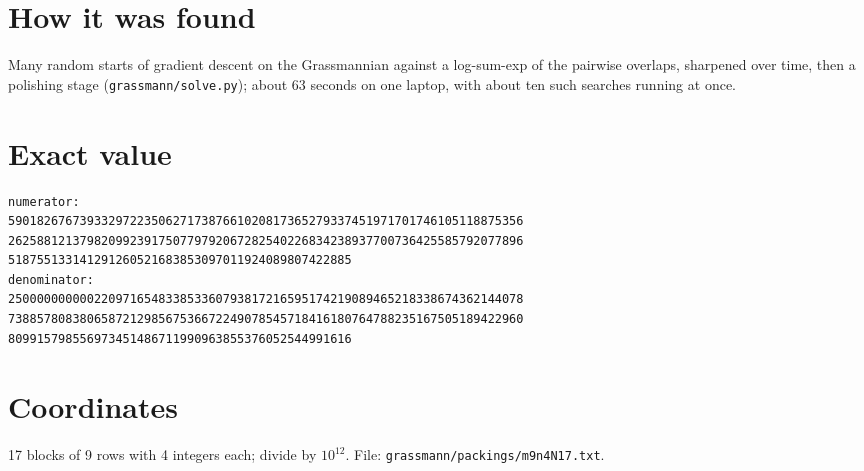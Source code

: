 \documentclass[11pt,a4paper]{article}
\begin{document}
\section{How it was found}
Many random starts of gradient descent on the Grassmannian against a log-sum-exp of the pairwise overlaps, sharpened over time, then a polishing stage (\texttt{grassmann/solve.py}); about 63 seconds on one laptop, with about ten such searches running at once.


\appendix
\section{Exact value}
{\small
\begin{verbatim}
numerator:
590182676739332972235062717387661020817365279337451971701746105118875356
262588121379820992391750779792067282540226834238937700736425585792077896
518755133141291260521683853097011924089807422885
denominator:
250000000000220971654833853360793817216595174219089465218338674362144078
738857808380658721298567536672249078545718416180764788235167505189422960
809915798556973451486711990963855376052544991616
\end{verbatim}}

\section{Coordinates}
17 blocks of 9 rows with 4 integers each; divide by $10^{12}$. File: \texttt{grassmann/packings/m9n4N17.txt}.
{\tiny
\begin{multicols}{3}
\end{multicols}}
\end{document}
